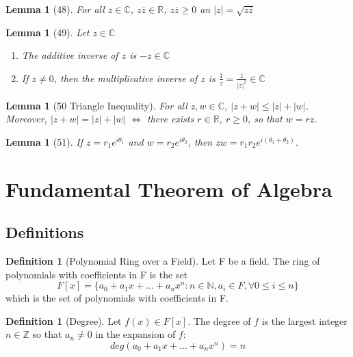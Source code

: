 \documentclass[12pt]{article}
\newtheorem{lem}[thm]{Lemma}  %
\theoremstyle{definition}
\newtheorem{defn}[thm]{Definition}
\theoremstyle{remark}
\numberwithin{equation}{section}
\newcommand\C{\mathbb C}    %
\newcommand\R{\mathbb R}    %
\newcommand\Z{\mathbb Z}    %
\newcommand\N{\mathbb N}    %
\begin{document}
\begin{lem}[48]
        For all $z \in \C$, $z\overline{z} \in \R$, $z\overline{z} \geq 0$ an $|z| = \sqrt{z\overline{z}}$
\end{lem}


\begin{lem}[49]
        Let $z \in \C$
        \begin{enumerate}
                \item The additive inverse of $z$ is $-z \in \C$
                \item If $z \neq 0$, then the multiplicative inverse of $z$ is $\frac{1}{z} = \frac{\overline{z}}{|z|^2} \in \C$
        \end{enumerate}
\end{lem}



\begin{lem}[50 Triangle Inequality]
        For all $z,w \in \C$, $|z+w| \leq |z| + |w|$. Moreover, $|z+w| = |z| + |w|$ $\iff$ there exists $r \in \R$, $r \geq 0$, so that $w =rz$.
\end{lem}



\begin{lem}[51]
        If $z = r_1e^{i\theta_1}$ and $w = r_2e^{i\theta_2}$, then $zw = r_1r_2e^{i(\theta_1+\theta_2)}$.
\end{lem}


\clearpage


\section{Fundamental Theorem of Algebra}


\subsection{Definitions}


\begin{defn}[Polynomial Ring over a Field]
        Let F be a field. The ring of polynomials with coefficients in F is the set $$F[x] = \{a_0 + a_1x+...+a_nx^n:n\in \N, a_i \in F,\forall 0 \leq i \leq n\}$$ which is the set of polynomials with coefficients in F.
\end{defn}


\begin{defn}[Degree]
        Let $f(x) \in F[x]$. The degree of $f$ is the largest integer $n \in \Z$ so that $a_n \neq 0$ in the expansion of $f$: $$deg(a_0+a_1x+...+a_nx^n) = n$$
\end{defn}
\end{document}
